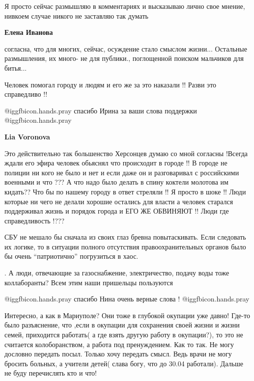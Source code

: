 \begin{itemize}
\begin{itemize}
Я просто сейчас размышляю в комментариях и высказываю лично свое мнение,
нивкоем случае никого не заставляю так думать

\textbf{Елена Иванова} 

согласна, что для многих, сейчас, осуждение стало смыслом жизни... Остальные
размышления, их много- не для публики., поглощенной поиском мальчиков для
битья...

\end{itemize} %

Человек помогал городу и людям и его же за это наказали !! Разви это справедливо !!

\begin{itemize} %
 @igg{fbicon.hands.pray} спасибо Ирина за ваши слова поддержки  @igg{fbicon.hands.pray} 

\textbf{Lia Voronova} 

Это действительно так большенство Херсонцев думаю со мной согласны !Всегда
ждали его эфира человек обьяснял что происходит в городе !! В городе не полиции
ни кого не было и нет и если даже он и разговаривал с российскими военными и
что ??? А что надо было делать в спину коктели молотова им кидать?? Что бы по
нашему городу в ответ стреляли !! Я просто в шоке !! Люди которые ни чего не
делали хорошие остались для власти а человек старался поддерживал жизнь и
порядок города и ЕГО ЖЕ ОБВИНЯЮТ !! Люди где справедливость !???

\end{itemize} %


СБУ не мешало бы сначала из своих глаз бревна повытаскивать. Если следовать их
логике, то в ситуации полного отсутствия правоохранительных органов было бы
очень \enquote{патриотично} погрузиться в хаос.

. А люди, отвечающие за газоснабжение, электричество, подачу воды тоже
коллаборанты? Всем этим наши пришельцы пользуются

 @igg{fbicon.hands.pray} спасибо Нина очень верные слова ! @igg{fbicon.hands.pray} 


Интересно, а как в Мариуполе? Они тоже в глубокой окупации уже давно! Где-то
было разъяснение, что ,если в окупации для сохранения своей жизни и жизни
семей, приходится работать( а где взять другую работу в окупации?), то это не
считается колоборанством, а работа под пренуждением. Как то так. Не могу
дословно передать посыл. Только хочу передать смысл. Ведь врачи не могу бросить
больных, а учители детей( слава богу, что до 30.04 работали). Дальше не буду
перечислять кто и что!


\end{itemize}
